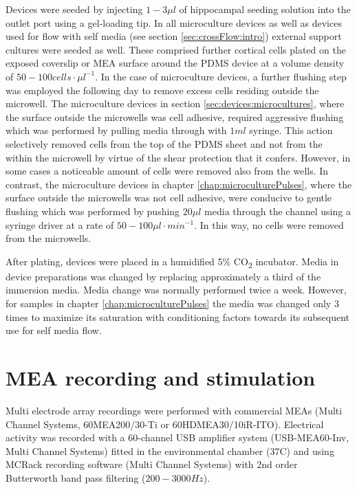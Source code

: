  Devices were seeded by injecting \(1-3\mu l\) of hippocampal seeding solution into the outlet port using a gel-loading tip. In all microculture devices as well as devices used for flow with self media (see section \ref{sec:crossFlow:intro}) external support cultures were seeded as well. These comprised further cortical cells plated on the exposed coverslip or MEA surface around the PDMS device at a volume density of \(50-100 cells\cdot\mu l^{-1}\). In the case of microculture devices, a further flushing step was employed the following day to remove excess cells residing outside the microwell. The microculture devices in section \ref{sec:devices:microcultures}, where the surface outside the microwells was cell adhesive, required aggressive flushing which was performed by pulling media through with \(1ml\) syringe. This action selectively removed cells from the top of the PDMS sheet and not from the within the microwell by virtue of the shear protection that it confers. However, in some cases a noticeable amount of cells were removed also from the wells. In contrast, the microculture devices in chapter \ref{chap:microculturePulses}, where the surface outside the microwells was not cell adhesive, were conducive to gentle flushing which was performed by pushing \(20\mu l\) media through the channel using a syringe driver at a rate of \(50-100 \mu l\cdot min^{-1}\). In this way, no cells were removed from the microwells.

 After plating, devices were placed in a humidified 5\% CO\textsubscript{2} incubator. Media in device preparations was changed by replacing approximately a third of the immersion media. Media change was normally performed twice a week. However, for samples in chapter \ref{chap:microculturePulses} the media was changed only 3 times to maximize its saturation with conditioning factors towards its subsequent use for self media flow.


         \label{sec:methods:culture}

\section{MEA recording and stimulation}
Multi electrode array recordings were performed with commercial MEAs (Multi Channel Systems, 60MEA200/30-Ti or 60HDMEA30/10iR-ITO). Electrical activity was recorded with a 60-channel USB amplifier system (USB-MEA60-Inv, Multi Channel Systems) fitted in the environmental chamber (37\degree C) and using MCRack recording software (Multi Channel Systems) with 2nd order Butterworth band pass filtering (\(200-3000Hz\)).

